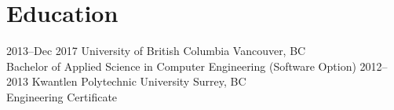 \documentclass[]{friggeri-cv} %
\begin{document}









\section{Education}

\begin{entrylist}
\entry
{2013--Dec 2017}
{University of British Columbia {\normalfont Vancouver, BC}}
{\\Bachelor of Applied Science in Computer Engineering (Software Option)}
\entry
{2012--2013}
  {Kwantlen Polytechnic University {\normalfont Surrey, BC}} %
{\\Engineering Certificate}
\end{entrylist}
\end{document}
